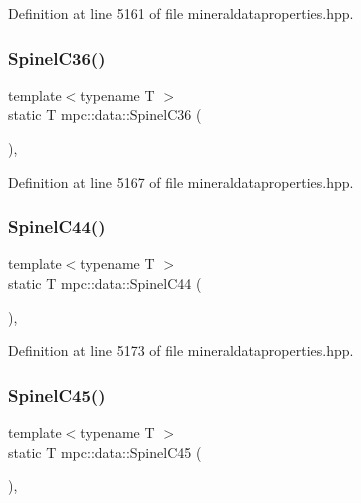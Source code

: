 Definition at line 5161 of file mineraldataproperties.\+hpp.

\mbox{\label{namespacempc_1_1data_aaa2351be5ef7d1eca32fbf032fdab93c}} 
\subsubsection{\texorpdfstring{Spinel\+C36()}{SpinelC36()}}
{\footnotesize\ttfamily template$<$typename T $>$ \\
static T mpc\+::data\+::\+Spinel\+C36 (\begin{DoxyParamCaption}{ }\end{DoxyParamCaption})\hspace{0.3cm}{\ttfamily [inline]}, {\ttfamily [static]}}



Definition at line 5167 of file mineraldataproperties.\+hpp.

\mbox{\label{namespacempc_1_1data_a28b739ccb8e5a5d430c93da8e0c27a29}} 
\subsubsection{\texorpdfstring{Spinel\+C44()}{SpinelC44()}}
{\footnotesize\ttfamily template$<$typename T $>$ \\
static T mpc\+::data\+::\+Spinel\+C44 (\begin{DoxyParamCaption}{ }\end{DoxyParamCaption})\hspace{0.3cm}{\ttfamily [inline]}, {\ttfamily [static]}}



Definition at line 5173 of file mineraldataproperties.\+hpp.

\mbox{\label{namespacempc_1_1data_acbb8600aaac4b04368f02409df1a701b}} 
\subsubsection{\texorpdfstring{Spinel\+C45()}{SpinelC45()}}
{\footnotesize\ttfamily template$<$typename T $>$ \\
static T mpc\+::data\+::\+Spinel\+C45 (\begin{DoxyParamCaption}{ }\end{DoxyParamCaption})\hspace{0.3cm}{\ttfamily [inline]}, {\ttfamily [static]}}




